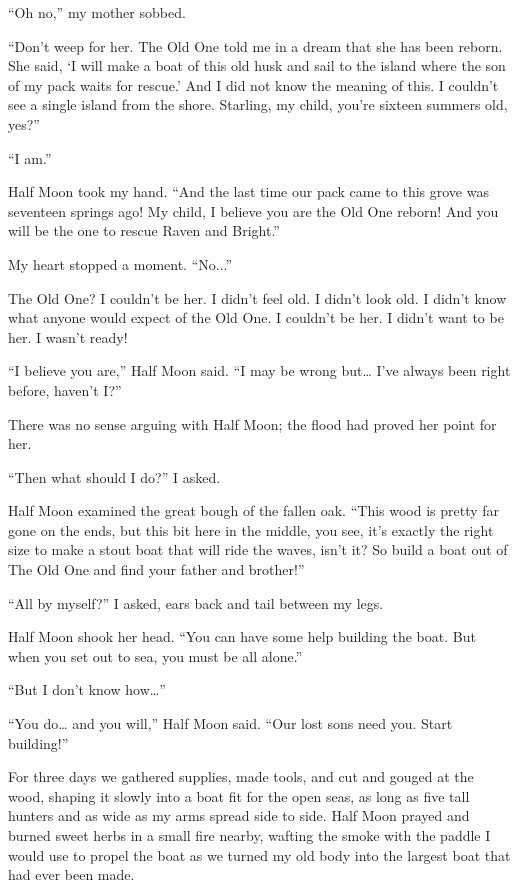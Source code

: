 ``Oh no,'' my mother sobbed.

``Don't weep for her. The Old One told me in a dream that she has been reborn. She said, `I will make a boat of this old husk and sail to the island where the son of my pack waits for rescue.' And I did not know the meaning of this. I couldn't see a single island from the shore. Starling, my child, you're sixteen summers old, yes?''

``I am.''

Half Moon took my hand. ``And the last time our pack came to this grove was seventeen springs ago! My child, I believe you are the Old One reborn! And you will be the one to rescue Raven and Bright.''

My heart stopped a moment. ``No...''

The Old One? I couldn't be her. I didn't feel old. I didn't look old. I didn't know what anyone would expect of the Old One. I couldn't be her. I didn't want to be her. I wasn't ready!

``I believe you are,'' Half Moon said. ``I may be wrong but\ldots{} I've always been right before, haven't I?''

There was no sense arguing with Half Moon; the flood had proved her point for her.

``Then what should I do?'' I asked.

Half Moon examined the great bough of the fallen oak. ``This wood is pretty far gone on the ends, but this bit here in the middle, you see, it's exactly the right size to make a stout boat that will ride the waves, isn't it? So build a boat out of The Old One and find your father and brother!''

``All by myself?'' I asked, ears back and tail between my legs.

Half Moon shook her head. ``You can have some help building the boat. But when you set out to sea, you must be all alone.''

``But I don't know how\ldots''

``You do\ldots{} and you will,'' Half Moon said. ``Our lost sons need you. Start building!''

\vspace{1ex}

\secdiv\pagebreak

\noindent For three days we gathered supplies, made tools, and cut and gouged at the wood, shaping it slowly into a boat fit for the open seas, as long as five tall hunters and as wide as my arms spread side to side. Half Moon prayed and burned sweet herbs in a small fire nearby, wafting the smoke with the paddle I would use to propel the boat as we turned my old body into the largest boat that had ever been made.

